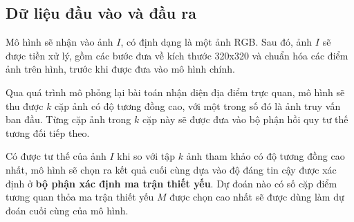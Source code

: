 \subsection{Dữ liệu đầu vào và đầu ra}
Mô hình sẽ nhận vào ảnh $I$, có định dạng là một ảnh RGB. Sau đó, ảnh $I$ sẽ được tiền xử lý, gồm các bước đưa về kích thước 320x320 và chuẩn hóa các điểm ảnh trên hình, trước khi được đưa vào mô hình chính.

Qua quá trình mô phỏng lại bài toán nhận diện địa điểm trực quan, mô hình sẽ thu được $k$ cặp ảnh có độ tương đồng cao, với một trong số đó là ảnh truy vấn ban đầu. Từng cặp ảnh trong $k$ cặp này sẽ được đưa vào bộ phận hồi quy tư thế tương đối tiếp theo.

Có được tư thế của ảnh $I$ khi so với tập $k$ ảnh tham khảo có độ tương đồng cao nhất, mô hình sẽ chọn ra kết quả cuối cùng dựa vào độ đáng tin cậy được xác định ở \textbf{bộ phận xác định ma trận thiết yếu}. Dự đoán nào có số cặp điểm tương quan thỏa ma trận thiết yếu $M$ được chọn cao nhất sẽ được dùng làm dự đoán cuối cùng của mô hình.


